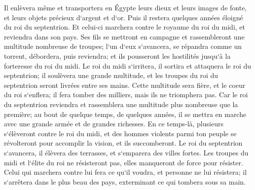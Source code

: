 \verse Il enlèvera même et transportera en Égypte leurs dieux et leurs images de fonte, et leurs objets précieux d`argent et d`or. Puis il restera quelques années éloigné du roi du septentrion. 
\verse Et celui-ci marchera contre le royaume du roi du midi, et reviendra dans son pays. 
\verse Ses fils se mettront en campagne et rassembleront une multitude nombreuse de troupes; l`un d`eux s`avancera, se répandra comme un torrent, débordera, puis reviendra; et ils pousseront les hostilités jusqu`à la forteresse du roi du midi. 
\verse Le roi du midi s`irritera, il sortira et attaquera le roi du septentrion; il soulèvera une grande multitude, et les troupes du roi du septentrion seront livrées entre ses mains. 
\verse Cette multitude sera fière, et le coeur du roi s`enflera; il fera tomber des milliers, mais ils ne triomphera pas. 
\verse Car le roi du septentrion reviendra et rassemblera une multitude plus nombreuse que la première; au bout de quelque temps, de quelques années, il se mettra en marche avec une grande armée et de grandes richesses. 
\verse En ce temps-là, plusieurs s`élèveront contre le roi du midi, et des hommes violents parmi ton peuple se révolteront pour accomplir la vision, et ils succomberont. 
\verse Le roi du septentrion s`avancera, il élèvera des terrasses, et s`emparera des villes fortes. Les troupes du midi et l`élite du roi ne résisteront pas, elles manqueront de force pour résister. 
\verse Celui qui marchera contre lui fera ce qu`il voudra, et personne ne lui résistera; il s`arrêtera dans le plus beau des pays, exterminant ce qui tombera sous sa main. 

